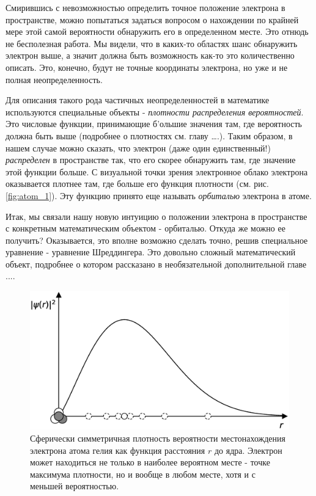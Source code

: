 Смирившись с невозможностью определить точное положение электрона в пространстве, можно попытаться задаться вопросом о нахождении по крайней мере этой самой вероятности обнаружить его в определенном месте.
Это отнюдь не бесполезная работа.
Мы видели, что в каких-то областях шанс обнаружить электрон выше, а значит должна быть возможность как-то это количественно описать.
Это, конечно, будут не точные координаты электрона, но уже и не полная неопределенность.

Для описания такого рода частичных неопределенностей в математике используются специальные объекты - \textit{плотности распределения вероятностей}.
Это числовые функции, принимающие б'ольшие значения там, где вероятность должна быть выше (подробнее о плотностях см. главу ….).
Таким образом, в нашем случае можно сказать, что электрон (даже один единственный!) \textit{распределен} в пространстве так, что его скорее обнаружить там, где значение этой функции больше.
С визуальной точки зрения электронное облако электрона оказывается плотнее там, где больше его функция плотности (см. рис. \ref{fig:atom_1}).
Эту функцию принято еще называть \textit{орбиталью} электрона в атоме.

Итак, мы связали нашу новую интуицию о положении электрона в пространстве с конкретным математическим объектом - орбиталью. 
Откуда же можно ее получить?
Оказывается, это вполне возможно сделать точно, решив специальное уравнение - уравнение Шреддингера.
Это довольно сложный математический объект, подробнее о котором рассказано в необязательной дополнительной главе ....

\begin{figure}[t!]
   \centering
   \includegraphics[scale=0.4]{images/radial_prob}
   \caption{Сферически симметричная плотность вероятности местонахождения электрона атома гелия как функция расстояния $r$ до ядра. Электрон может находиться не только в наиболее вероятном месте - точке максимума плотности, но и вообще в любом месте, хотя и с меньшей вероятностью.}
   \label{fig:radial_prob}
\end{figure}

